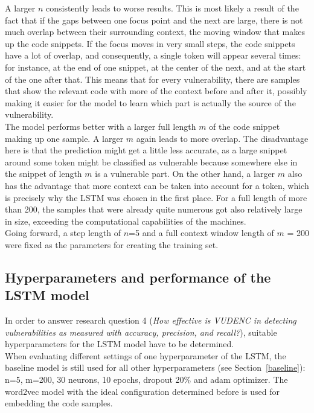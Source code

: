 \documentclass[
a4paper,
pagesize,
pdftex,
12pt,
ngerman,
fleqn,
final,
]{scrartcl}
\begin{document}
	A larger $n$ consistently leads to worse results. This is most likely a result of the fact that if the gaps between one focus point and the next are large, there is not much overlap between their surrounding context, the moving window that makes up the code snippets. If the focus moves in very small steps, the code snippets have a lot of overlap, and consequently, a single token will appear several times: for instance, at the end of one snippet, at the center of the next, and at the start of the one after that. This means that for every vulnerability, there are samples that show the relevant code with more of the context before and after it, possibly making it easier for the model to learn which part is actually the source of the vulnerability.\\
	The model performs better with a larger full length $m$ of the code snippet making up one sample. A larger $m$ again leads to more overlap. The disadvantage here is that the prediction might get a little less accurate, as a large snippet around some token might be classified as vulnerable because somewhere else in the snippet of length $m$ is a vulnerable part. On the other hand, a larger $m$ also has the advantage that more context can be taken into account for a token, which is precisely why the LSTM was chosen in the first place. For a full length of more than 200, the samples that were already quite numerous got also relatively large in size, exceeding the computational capabilities of the machines. \\
	Going forward, a step length of $n$=5 and a full context window length of $m$ = 200 were fixed as the parameters for creating the training set.
	
	\subsection{Hyperparameters and performance of the LSTM model}
	
	In order to answer research question 4 (\textit{How effective is VUDENC in detecting vulnerabilities as measured with accuracy, precision, and recall?}), suitable hyperparameters for the LSTM model have to be determined.\\
	When evaluating different settings of one hyperparameter of the LSTM, the baseline model is still used for all other hyperparameters (see Section~\ref{baseline}): n=5, m=200, 30 neurons, 10 epochs, dropout 20\% and adam optimizer. The word2vec model with the ideal configuration determined before is used for embedding the code samples.
\end{document}
